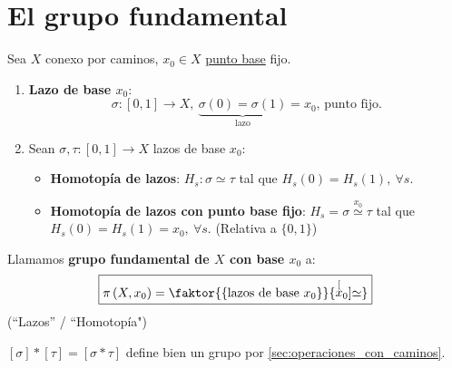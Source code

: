 \section{El grupo fundamental}%
\label{sec:el_grupo_fundamental}
Sea $X$ conexo por caminos, $x_0 \in X$ \underline{punto base} fijo.
\begin{defi}
\begin{enumerate}
    \item \textbf{Lazo de base $x_0$}:
    \[
        \sigma: \left[ 0, 1 \right] \rightarrow X,\ \underbrace{\sigma\left( 0 \right) = \sigma\left( 1 \right)}_{\text{lazo}} = x_0 \text{, punto fijo.}
    \]

    \item Sean $\sigma, \tau: \left[ 0, 1 \right] \rightarrow X$ lazos de base $x_0$:
    \begin{itemize}
        \item \textbf{Homotopía de lazos}: $H_s: \sigma \simeq \tau$ tal que $H_s\left( 0 \right) = H_s\left( 1 \right),\ \forall s$.
        \item \textbf{Homotopía de lazos con punto base fijo}: $H_s = \sigma \stackrel{x_0}{\simeq} \tau$ tal que $H_s\left( 0 \right) = H_s\left( 1 \right) = x_0,\ \forall s$. (Relativa a $\{0, 1\}$)
    \end{itemize}
\end{enumerate}
\end{defi}
\begin{defi}
\begin{itemize}
    Llamamos \textbf{grupo fundamental de $X$ con base $x_0$} a:
    \[
    \boxed{\pi\left( X, x_0 \right) = \faktor{\left\{ \text{lazos de base } x_0 \right\}}{\stackrel[x_0]{}{\simeq}}}
    \] (``Lazos'' / ``Homotopía")

\end{itemize}
\end{defi}

\begin{obs}
$\left[ \sigma \right] * \left[ \tau \right] = \left[ \sigma * \tau \right]$ define bien un grupo por \ref{sec:operaciones_con_caminos}.
\end{obs}

